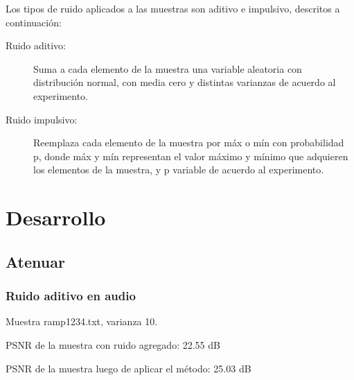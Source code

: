 \documentclass[a4paper,10pt,twoside]{article}
\begin{document}
Los tipos de ruido aplicados a las muestras son aditivo e impulsivo, descritos a continuación:

\begin{description}

\item[Ruido aditivo:]

Suma a cada elemento de la muestra una variable aleatoria con distribución normal, con media cero y distintas varianzas de acuerdo al experimento.

\item[Ruido impulsivo:]

Reemplaza cada elemento de la muestra por máx o mín con probabilidad p, donde máx y mín representan el valor máximo y mínimo que adquieren los elementos de la muestra, y p variable de acuerdo al experimento.

\end{description}




\section{Desarrollo}




\subsection{Atenuar}


\subsubsection{Ruido aditivo en audio}

Muestra ramp1234.txt, varianza 10.

PSNR de la muestra con ruido agregado: 22.55 dB

PSNR de la muestra luego de aplicar el método: 25.03 dB
\end{document}
